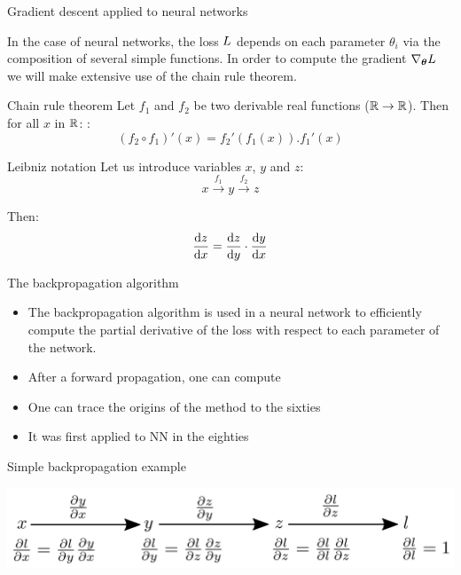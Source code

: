 \documentclass[xcolor=pdftex,dvipsnames,table,mathserif]{beamer}
\begin{document}
\begin{frame}{Gradient descent applied to neural networks}

  In the case of neural networks, the loss $L$ depends on each parameter $\theta_i$ via the composition of several simple functions. In order to compute the gradient $\nabla_{\boldsymbol{\theta}}L$ we will make extensive use of the chain rule theorem.

  \begin{block}{Chain rule theorem}
    Let $f_1$ and $f_2$ be two derivable real functions ($\mathbb{R} \rightarrow \mathbb{R}$). Then for all $x$ in $\mathbb{R}$:   :
    \[
     (f_2 \circ f_1)'(x) = f_2'(f_1(x)).f_1'(x)
    \]
  \end{block}


\begin{block}{Leibniz notation}
  Let us introduce variables $x$, $y$ and $z$:
  \[x \xrightarrow{f_1} y \xrightarrow{f_2} z\]

  Then:
  \[\dv{z}{x} = \dv{z}{y} \cdot \dv{y}{x} \]

\end{block}

\end{frame}


\begin{frame}{The backpropagation algorithm}

  \begin{itemize}
  \item The backpropagation algorithm is used in a neural network to efficiently compute the partial derivative of the loss with respect to each parameter of the network.
  \item After a forward propagation, one can compute
  \item One can trace the origins of the method to the sixties
  \item It was first applied to NN in the eighties \cite{werbos_applications_1982, lecun_procedure_1985}
  \end{itemize}


\end{frame}



\begin{frame}{Simple backpropagation example}

\includegraphics[width=\textwidth]{../graphics/bp_simple.png}

\end{frame}
\end{document}
